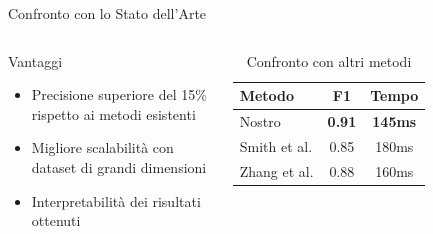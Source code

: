\documentclass[aspectratio=169,11pt]{beamer}
\begin{document}
\begin{frame}{Confronto con lo Stato dell'Arte}
  \begin{columns}[T]
    \begin{exampleblock}{Vantaggi}
      \begin{itemize}
        \item Precisione superiore del 15\% rispetto ai metodi esistenti
        \item Migliore scalabilità con dataset di grandi dimensioni
        \item Interpretabilità dei risultati ottenuti
      \end{itemize}
    \end{exampleblock}
    
    \begin{table}
      \centering
      \footnotesize
      \begin{tabular}{lcc}
        \toprule
        \textbf{Metodo} & \textbf{F1} & \textbf{Tempo} \\
        \midrule
        Nostro & \textbf{0.91} & \textbf{145ms} \\
        Smith et al. & 0.85 & 180ms \\
        Zhang et al. & 0.88 & 160ms \\
        \bottomrule
      \end{tabular}
      \caption{Confronto con altri metodi}
    \end{table}
  \end{columns}
\end{frame}

\end{document}
